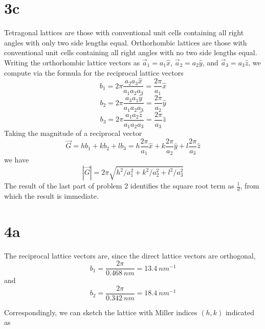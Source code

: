 \documentclass{article}
\begin{document}
\section*{3c}
Tetragonal lattices are those with conventional unit cells containing all right angles with only two side lengths equal.
Orthorhombic lattices are those with conventional unit cells containing all right angles with no two side lengths equal.
Writing the orthorhombic lattice vectors as $\vec{a}_{1}=a_{1}\hat{x}$, $\vec{a}_{2}=a_{2}\hat{y}$, and $\vec{a}_{3}=a_{3}\hat{z}$,
we compute via the formula for the reciprocal lattice vectors
\[
  b_{1}=2\pi\frac{a_{2}a_{3}\hat{x}}{a_{1}a_{2}a_{3}}=\frac{2\pi}{a_{1}}\hat{x}
\]
\[
  b_{2}=2\pi\frac{a_{3}a_{1}\hat{y}}{a_{1}a_{2}a_{3}}=\frac{2\pi}{a_{2}}\hat{y}
\]
\[
  b_{3}=2\pi\frac{a_{1}a_{2}\hat{z}}{a_{1}a_{2}a_{3}}=\frac{2\pi}{a_{3}}\hat{z}
\]
Taking the magnitude of a reciprocal vector
\[
  \vec{G}=hb_{1}+kb_{2}+lb_{3}=h\frac{2\pi}{a_{1}}\hat{x}+k\frac{2\pi}{a_{2}}\hat{y}+l\frac{2\pi}{a_{3}}\hat{z}
\]
we have
\[
  |\vec{G}|=2\pi\sqrt{h^{2}/a_{1}^{2}+k^{2}/a_{2}^{2}+l^{2}/a_{3}^{2}}
\]
The result of the last part of problem 2 identifies the square root term as $\frac{1}{d}$, from which the result is immediate.

\section*{4a}
The reciprocal lattice vectors are, since the direct lattice vectors are orthogonal,
\[
  b_{1}=\frac{2\pi}{\SI{0.468}{nm}}=\SI{13.4}{nm^{-1}}
\]
and
\[
  b_{2}=\frac{2\pi}{\SI{0.342}{nm}}=\SI{18.4}{nm^{-1}}
\]

Correspondingly, we can sketch the lattice with Miller indices $(h,k)$ indicated as
\begin{center}
\end{center}
\end{document}
